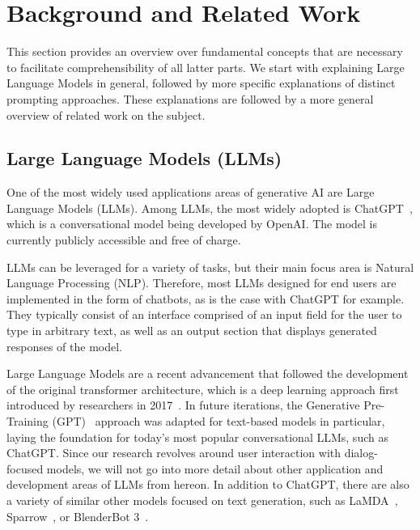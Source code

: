 \section{Background and Related Work}
\label{sec:background-and-related-work}

This section provides an overview over fundamental concepts that are necessary to
facilitate comprehensibility of all latter parts.
We start with explaining Large Language Models in general, followed by more specific explanations
of distinct prompting approaches.
These explanations are followed by a more general overview of related work on the subject.


\subsection{Large Language Models (LLMs)}
\label{subsec:large-language-models-(llms)}
One of the most widely used applications areas of generative AI are Large Language Models (LLMs).
Among LLMs, the most widely adopted is ChatGPT~\cite{openai_chatgpt_2023}, which is a
conversational model being developed by OpenAI\@.
The model is currently publicly accessible and free of charge.

LLMs can be leveraged for a variety of tasks, but their main focus area is Natural Language Processing
(NLP).
Therefore, most LLMs designed for end users are implemented in the form of chatbots,
as is the case with ChatGPT for example.
They typically consist of an interface comprised of an input field for the user to type in arbitrary
text, as well as an output section that displays generated responses of the model.

Large Language Models are a recent advancement that followed the development of the original
transformer architecture, which is a deep learning approach first introduced by researchers in 2017~\cite{vaswani_attention_2017}.
In future iterations, the Generative Pre-Training (GPT)~\cite{radford_improving_2018} approach
was adapted for text-based models in particular, laying the foundation for today's most
popular conversational LLMs, such as ChatGPT\@.
Since our research revolves around user interaction with dialog-focused models, we will not go into
more detail about other application and development areas of LLMs from hereon.
In addition to ChatGPT, there are also a variety of similar other models focused on text generation,
such as LaMDA~\cite{thoppilan_lamda_2022}, Sparrow~\cite{glaese_improving_2022}, or
BlenderBot 3~\cite{shuster_blenderbot_2022}.


